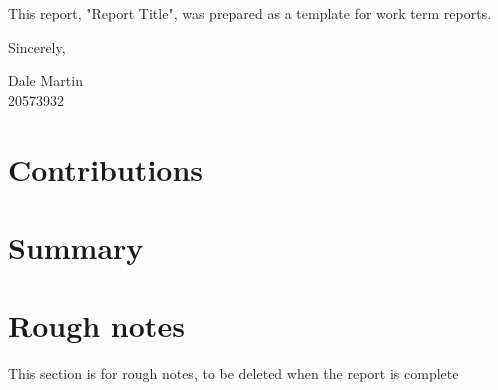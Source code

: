 \documentclass[11pt, a4paper]{article}
\begin{document}
\begin{singlespacing}
\begin{raggedright}
        This report, "Report Title", was prepared as a template for work term reports.
        \blindtext
        
        \blindtext
        
        \medskip
        
        Sincerely,
        \vspace{2.5cm}
        
        
        Dale Martin \\
        20573932
        \thispagestyle{empty} %
    \end{raggedright}
    
    \begin{onehalfspacing}
        \pagebreak
        \section*{Contributions}
        \blindtext
        
        \pagebreak
        \section*{Summary}
        \blindtext\par
        \blindtext\par
        \blindtext\par
        
        
    \end{onehalfspacing}
        
    \pagebreak
    \renewcommand{\contentsname}{\Large\bfseries Table of Contents}
    \tableofcontents
    
    \pagebreak
    \renewcommand{\listfigurename}{\Large\bfseries List of Figures}
    \listoffigures
    
    \pagebreak
    \renewcommand{\listtablename}{\Large\bfseries List of Tables}
    \listoftables
    \pagebreak
        
\end{singlespacing}


\pagebreak
\section{Rough notes}
This section is for rough notes, to be deleted when the report is complete
\end{document}
